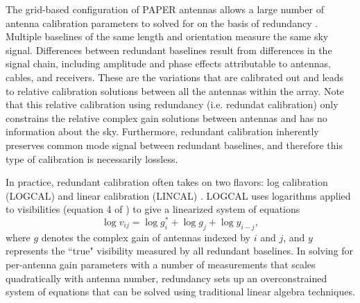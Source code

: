 \documentclass[twocolumn,numberedappendix]{emulateapj} \shorttitle{PSA64}
\begin{document}
The grid-based configuration of PAPER antennas allows a large number of 
antenna calibration parameters to 
solved for on the basis of redundancy \citep{wieringa1992,liu_et_al2012,parsons_et_al2012a}.
Multiple baselines of the same length and orientation measure the same sky
signal. Differences between redundant baselines result from
differences in the signal chain, including amplitude and phase effects attributable to
antennas, cables, and receivers. These are the variations that are
calibrated out and leads to relative calibration solutions between all the
antennas within the array.  Note that this relative calibration using redundancy
(i.e. redundat calibration) only constrains the relative complex gain solutions
between antennas and has no information about the sky. Furthermore, redundant
calibration inherently preserves common mode signal between redundant baselines,
and therefore this type of calibration is necessarily lossless. 


In practice, redundant calibration often takes on two flavors: log calibration (LOGCAL) and
linear calibration (LINCAL) \citep{liu_et_al2010,zheng_et_al2014}. LOGCAL uses 
logarithms applied to visibilities (equation 4 of
\citealt{zheng_et_al2014}) to give a linearized system of equations
\begin{equation}\label{eqn:logcal}
    \log{v_{ij}} = \log{g_{i}^{*}} + \log{g_{j}} + \log{y_{i-j}},
\end{equation}
where $g$ denotes the 
complex gain of antennas indexed by $i$ and $j$, and $y$ represents the ``true" visibility 
measured by all redundant baselines.  In solving for per-antenna gain parameters with
a number of measurements that scales quadratically with antenna number, redundancy sets up 
an overconstrained
system of equations that can be solved
using traditional linear algebra techniques.
\end{document}

